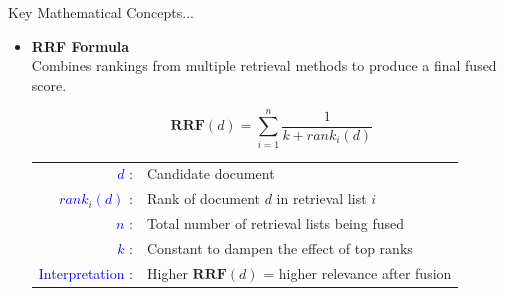 \begin{frame}{Key Mathematical Concepts...}
    \begin{itemize}
        \item \textbf{RRF Formula} \\
        Combines rankings from multiple retrieval methods to produce a final fused score.
        
        \begin{center}
        \Large
        $$
        \textbf{RRF}(d) = \sum_{i=1}^{n} \frac{1}{k + rank_i(d)}
        $$
        \end{center}
        
        \begin{center}
        \begin{tabular}{rl}
             \textcolor{blue}{$d$ :} & Candidate document \\
             \textcolor{blue}{$rank_i(d)$ :} & Rank of document $d$ in retrieval list $i$ \\
             \textcolor{blue}{$n$ :} & Total number of retrieval lists being fused \\
            \textcolor{blue}{$k$ :} & Constant to dampen the effect of top ranks \\
             \textcolor{blue}{Interpretation :} & Higher $\textbf{RRF}(d)$ = higher relevance after fusion
        \end{tabular}
        \end{center}
    \end{itemize}
    \vspace{0.3cm}
\end{frame}

        

